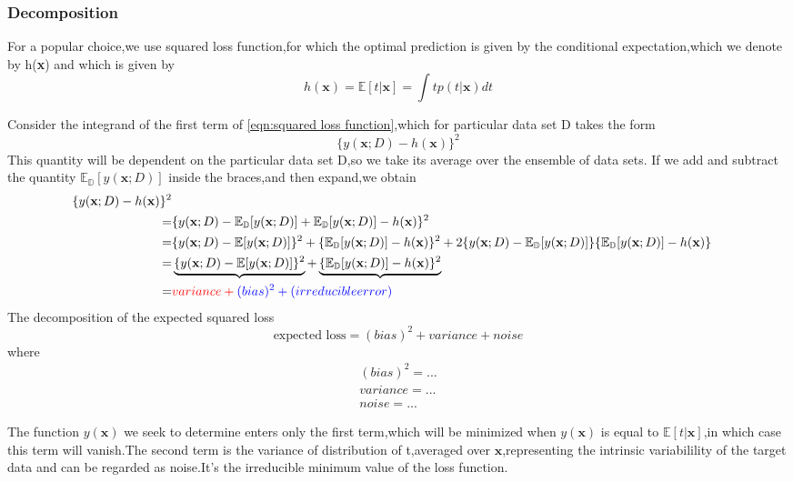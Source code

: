 \subsubsection{Decomposition}
For a popular choice,we use squared loss function,for which the optimal prediction is given by the conditional
expectation,which we denote by h(\textbf{x}) and which is given by 
\begin{equation}
h(\textbf{x}) = \mathbb{E}[t|\textbf{x}] = \int tp(t|\textbf{x})dt
\end{equation}

Consider the integrand of the first term of \ref{eqn:squared loss function},which for particular data set D takes the form
\begin{equation}
\{ y(\textbf{x};D) - h(\textbf{x}) \} ^2
\end{equation}
This quantity will be dependent on the particular data set D,so we take its average over the ensemble of data sets.
If we add and subtract the quantity $ \mathbb{E_D}[y(\textbf{x};D)] $ inside the braces,and then expand,we obtain
\begin{align}
\{ y(\textbf{x};D) - h(\textbf{x}) \} ^2 \\
=&\{y(\textbf{x};D) - \mathbb{E_D}[y(\textbf{x};D)] + \mathbb{E_D}[y(\textbf{x};D)] -h(\textbf{x})  \}^2         \\
=& \{ y(\textbf{x};D) -\mathbb{E}[y(\textbf{x};D)]    \}^2 + \{ \mathbb{E_D}[y(\textbf{x};D)] - h(\textbf{x})\}^2 +
2\{ y(\textbf{x};D) - \mathbb{E_D}[y(\textbf{x};D)]\}\{ \mathbb{E_D}[y(\textbf{x};D)] -h(\textbf{x})\} \\
=& \underbrace{\{ y(\textbf{x};D) -\mathbb{E}[y(\textbf{x};D)]    \}^2} + \underbrace{\{ \mathbb{E_D}[y(\textbf{x};D)] - h(\textbf{x})\}^2}   \\
=&                    \color{red}{variance}                 +   \color{blue}{(bias)^2}  + (irreducible error)
\end{align}
The decomposition of the expected squared loss
\begin{equation}
\text{expected loss} = (bias)^2 + variance + noise
\end{equation}
where
\begin{eqnarray}
(bias)^2 = ... \\
variance = ... \\
noise = ...
\end{eqnarray}

The function $ y(\textbf{x}) $ we seek to determine enters only the first term,which will be minimized when $ y(\textbf{x}) $ is equal to $ \mathbb{E}[t|\textbf{x}] $,in which case this term will vanish.The second term is the variance of distribution of t,averaged over $ \textbf{x} $,representing the intrinsic variabilility of the target data and can be regarded as noise.It's the irreducible minimum value of the loss function.

